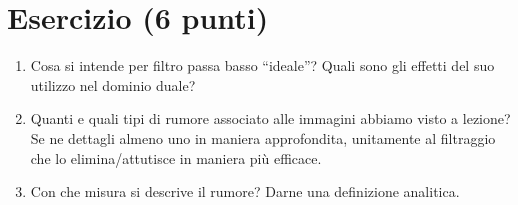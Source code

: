 \documentclass[a4paper]{article}
\newcommand{\dquotes}[1]{``#1''}
\begin{document}
	\section{Esercizio (6 punti)}
	
	\begin{enumerate}[label=\alph*)]
		\item Cosa si intende per filtro passa basso \dquotes{ideale}? Quali sono gli effetti del suo utilizzo nel dominio duale?
		
		\item Quanti e quali tipi di rumore associato alle immagini abbiamo visto a lezione? Se ne dettagli almeno uno in maniera approfondita, unitamente al filtraggio che lo elimina/attutisce in maniera più efficace.
		
		\item Con che misura si descrive il rumore? Darne una definizione analitica.
	\end{enumerate}
\end{document}
